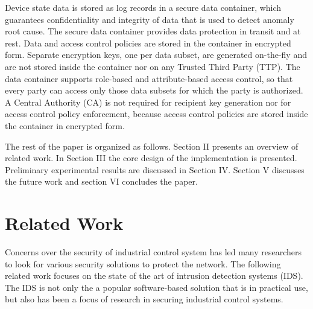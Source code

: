 \documentclass[conference]{IEEEtran}
\begin{document}
Device state data is stored as log records in a secure data container, which guarantees confidentiality and integrity of data that is used to detect anomaly root cause. The secure data container provides data protection in transit and at rest. Data and access control policies are stored in the container in encrypted form. Separate encryption keys, one per data subset, are generated on-the-fly and are not stored inside the container nor on any Trusted Third Party (TTP). The data container supports role-based and attribute-based access control, so that every party can access only those data subsets for which the party is authorized. A Central Authority (CA) is not required for recipient key generation nor for access control policy enforcement, because access control policies are stored inside the container in encrypted form.      
\par The rest of the paper is organized as follows. Section II presents an overview of related work. In Section III the core design of the implementation is presented. Preliminary experimental results are discussed in Section IV. Section V discusses the future work and section VI concludes the paper.  

\section{Related Work}

Concerns over the security of industrial control system has led many researchers to look for various security solutions to protect the network. The following related work focuses on the state of the art of intrusion detection systems (IDS).  The IDS is not only the a popular software-based solution that is in practical use, but also has been a focus of research in securing industrial control systems.
\end{document}
